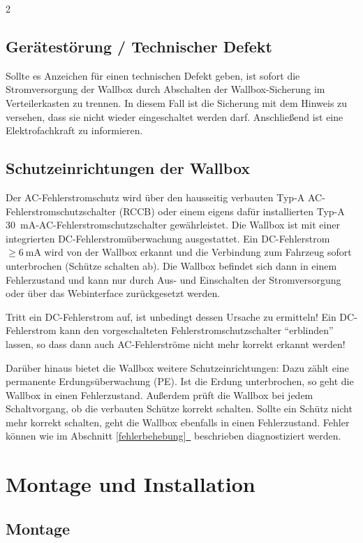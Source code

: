\documentclass[a4paper,10pt]{article}
\newcommand{\hint}[1]{\begin{tcolorbox}[colback=boxgray,colframe=black,coltext=
white,title=Hinweis,left*=2mm,right*=2mm,boxsep=1mm,bottom=1mm,top=1mm]#1\end{tcolorbox}}
\newcommand*{\fullref}[1]{Abschnitt \hyperref[{#1}]{\ref*{#1}~\nameref*{#1}}}
\begin{document}
\begin{multicols*}{2}
    \subsection{Gerätestörung / Technischer Defekt}
    Sollte es Anzeichen für einen technischen Defekt geben, ist sofort die
    Stromversorgung der Wallbox durch Abschalten der Wallbox-Sicherung im Verteilerkasten zu trennen.
    In diesem Fall ist die Sicherung mit dem Hinweis zu versehen, dass sie nicht wieder eingeschaltet werden darf.
    Anschließend ist eine Elektrofachkraft zu informieren.

    \subsection{Schutzeinrichtungen der Wallbox}\label{dcerrorhint}
    Der AC-Fehlerstromschutz wird über den hausseitig verbauten
    Typ-A AC-Fehlerstromschutzschalter (RCCB) oder einem eigens dafür installierten
    Typ-A \SI{30}{\milli\ampere}-AC-Fehlerstromschutzschalter gewährleistet. Die Wallbox ist
    mit einer integrierten DC-Fehlerstromüberwachung ausgestattet.
    Ein DC-Fehlerstrom $\geq \SI{6}{\milli\ampere}$ wird von der Wallbox erkannt und die Verbindung zum Fahrzeug sofort
    unterbrochen (Schütze schalten ab). Die Wallbox befindet sich dann in einem
    Fehlerzustand und kann nur durch Aus- und Einschalten der
    Stromversorgung oder über das Webinterface zurückgesetzt werden.
    \hint{Tritt ein DC-Fehlerstrom auf, ist unbedingt dessen Ursache zu
    ermitteln! Ein DC-Fehlerstrom kann den vorgeschalteten Fehlerstromschutzschalter
    \enquote{erblinden} lassen, so dass dann auch AC-Fehlerströme
    nicht mehr korrekt erkannt werden!}
    Darüber hinaus bietet die Wallbox weitere Schutzeinrichtungen: Dazu zählt eine
    permanente Erdungsüberwachung (PE). Ist die Erdung unterbrochen, so geht die
    Wallbox in einen Fehlerzustand. Außerdem prüft die Wallbox bei jedem
    Schaltvorgang, ob die verbauten Schütze korrekt schalten. Sollte ein
    Schütz nicht mehr korrekt schalten, geht die Wallbox ebenfalls in einen Fehlerzustand.
    Fehler können wie im \fullref{fehlerbehebung} beschrieben diagnostiziert werden.

    \newpage
    \section{Montage und Installation}
    \subsection{Montage}

\end{multicols*}
\end{document}
